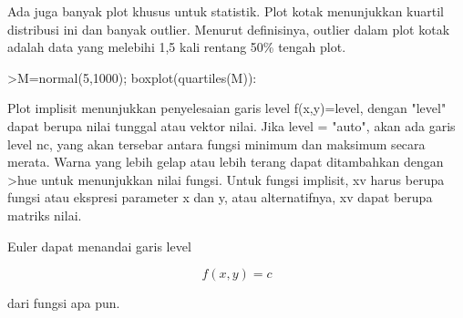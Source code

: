\documentclass[a4paper,10pt]{article}
\begin{document}
\begin{eulernotebook}
\begin{eulercomment}
\begin{eulercomment}
\begin{eulercomment}
\begin{eulercomment}
\begin{eulercomment}
\begin{eulercomment}
\begin{eulercomment}
\begin{eulercomment}
\begin{eulercomment}
\begin{eulercomment}
\begin{eulercomment}
\begin{eulercomment}
\begin{eulercomment}
\begin{eulercomment}
\begin{eulercomment}
\begin{eulercomment}
\begin{eulercomment}
\begin{eulercomment}
\begin{eulercomment}
\begin{eulercomment}
\begin{eulercomment}
\begin{eulercomment}
\begin{eulercomment}
\begin{eulercomment}
\begin{eulercomment}
\begin{eulercomment}
\begin{eulercomment}
\begin{eulercomment}
\begin{eulercomment}
\begin{eulercomment}
\begin{eulercomment}
\begin{eulercomment}
\begin{eulercomment}
\begin{eulercomment}
\begin{eulercomment}
\begin{eulercomment}
\begin{eulercomment}
Ada juga banyak plot khusus untuk statistik. Plot kotak menunjukkan
kuartil distribusi ini dan banyak outlier. Menurut definisinya,
outlier dalam plot kotak adalah data yang melebihi 1,5 kali rentang
50\% tengah plot.
\end{eulercomment}
\begin{eulerprompt}
>M=normal(5,1000); boxplot(quartiles(M)):
\end{eulerprompt}
\begin{eulercomment}
Plot implisit menunjukkan penyelesaian garis level f(x,y)=level,
dengan "level" dapat berupa nilai tunggal atau vektor nilai. Jika
level = "auto", akan ada garis level nc, yang akan tersebar antara
fungsi minimum dan maksimum secara merata. Warna yang lebih gelap atau
lebih terang dapat ditambahkan dengan \textgreater{}hue untuk menunjukkan nilai
fungsi. Untuk fungsi implisit, xv harus berupa fungsi atau ekspresi
parameter x dan y, atau alternatifnya, xv dapat berupa matriks nilai.

Euler dapat menandai garis level

\end{eulercomment}
\begin{eulerformula}
\[
f(x,y) = c
\]
\end{eulerformula}
\begin{eulercomment}
dari fungsi apa pun.


\end{eulercomment}
\end{eulercomment}
\end{eulercomment}
\end{eulercomment}
\end{eulercomment}
\end{eulercomment}
\end{eulercomment}
\end{eulercomment}
\end{eulercomment}
\end{eulercomment}
\end{eulercomment}
\end{eulercomment}
\end{eulercomment}
\end{eulercomment}
\end{eulercomment}
\end{eulercomment}
\end{eulercomment}
\end{eulercomment}
\end{eulercomment}
\end{eulercomment}
\end{eulercomment}
\end{eulercomment}
\end{eulercomment}
\end{eulercomment}
\end{eulercomment}
\end{eulercomment}
\end{eulercomment}
\end{eulercomment}
\end{eulercomment}
\end{eulercomment}
\end{eulercomment}
\end{eulercomment}
\end{eulercomment}
\end{eulercomment}
\end{eulercomment}
\end{eulercomment}
\end{eulercomment}
\end{eulernotebook}
\end{document}

